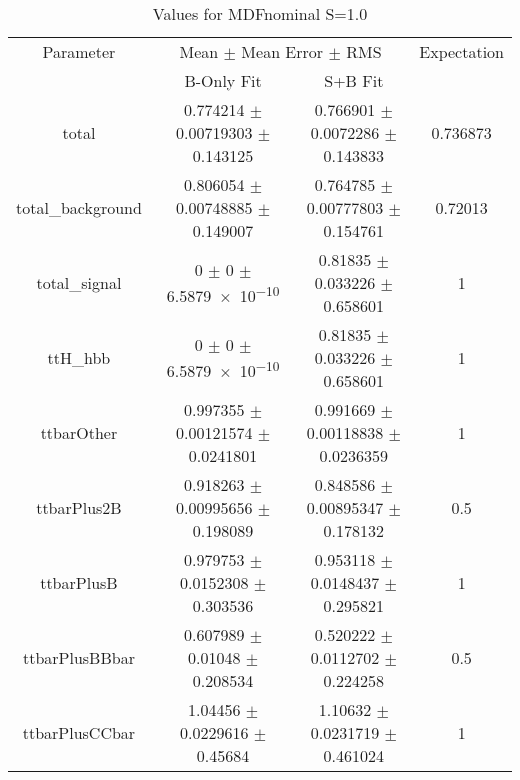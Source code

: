 \begin{table}
\centering
\caption{Values for MDFnominal S=1.0}
\begin{tabular}{cccc}
\toprule
Parameter & \multicolumn{2}{c}{Mean $\pm$ Mean Error $\pm$ RMS} & Expectation\\
 & B-Only Fit & S+B Fit & \\
\midrule
total & \num{0.774214} $\pm$ \num{0.00719303} $\pm$ \num{0.143125} & \num{0.766901} $\pm$ \num{0.0072286} $\pm$ \num{0.143833} & \num{0.736873}\\
total\_background & \num{0.806054} $\pm$ \num{0.00748885} $\pm$ \num{0.149007} & \num{0.764785} $\pm$ \num{0.00777803} $\pm$ \num{0.154761} & \num{0.72013}\\
total\_signal & \num{0} $\pm$ \num{0} $\pm$ \num{6.5879e-10} & \num{0.81835} $\pm$ \num{0.033226} $\pm$ \num{0.658601} & \num{1}\\
ttH\_hbb & \num{0} $\pm$ \num{0} $\pm$ \num{6.5879e-10} & \num{0.81835} $\pm$ \num{0.033226} $\pm$ \num{0.658601} & \num{1}\\
ttbarOther & \num{0.997355} $\pm$ \num{0.00121574} $\pm$ \num{0.0241801} & \num{0.991669} $\pm$ \num{0.00118838} $\pm$ \num{0.0236359} & \num{1}\\
ttbarPlus2B & \num{0.918263} $\pm$ \num{0.00995656} $\pm$ \num{0.198089} & \num{0.848586} $\pm$ \num{0.00895347} $\pm$ \num{0.178132} & \num{0.5}\\
ttbarPlusB & \num{0.979753} $\pm$ \num{0.0152308} $\pm$ \num{0.303536} & \num{0.953118} $\pm$ \num{0.0148437} $\pm$ \num{0.295821} & \num{1}\\
ttbarPlusBBbar & \num{0.607989} $\pm$ \num{0.01048} $\pm$ \num{0.208534} & \num{0.520222} $\pm$ \num{0.0112702} $\pm$ \num{0.224258} & \num{0.5}\\
ttbarPlusCCbar & \num{1.04456} $\pm$ \num{0.0229616} $\pm$ \num{0.45684} & \num{1.10632} $\pm$ \num{0.0231719} $\pm$ \num{0.461024} & \num{1}\\
\bottomrule
\end{tabular}
\end{table}